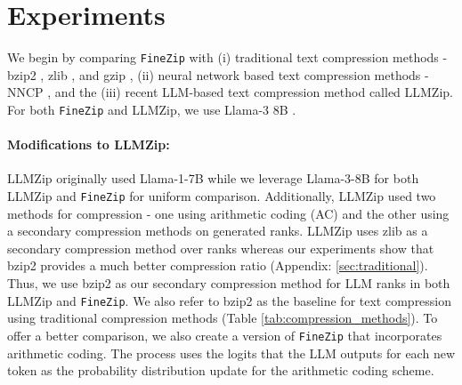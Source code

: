 \documentclass[11pt]{article}
\begin{document}





\section{Experiments}
We begin by comparing \texttt{FineZip} with (i) traditional text compression methods - bzip2 \cite{bzip2}, zlib \cite{zlib}, and gzip \cite{gzip}, (ii) neural network based text compression methods - NNCP \cite{Bellard2021NNCPVL}, and the (iii) recent LLM-based text compression method called LLMZip. For both  \texttt{FineZip} and LLMZip, we use Llama-3 8B \cite{llama3}.

\paragraph{Modifications to LLMZip:} LLMZip originally used Llama-1-7B \cite{llama1} while we leverage Llama-3-8B for both LLMZip and \texttt{FineZip} for uniform comparison. Additionally, LLMZip used two methods for compression - one using arithmetic coding (AC) and the other using a secondary compression methods on generated ranks. LLMZip uses zlib \cite{zlib} as a secondary compression method over ranks whereas our experiments show that bzip2 provides a much better compression ratio (Appendix: \ref{sec:traditional}). Thus, we use bzip2 as our secondary compression method for LLM ranks in both LLMZip and \texttt{FineZip}. We also refer to bzip2 as the baseline for text compression using traditional compression methods (Table \ref{tab:compression_methods}). To offer a better comparison, we also create a version of \texttt{FineZip} that incorporates arithmetic coding. The process uses the logits that the LLM outputs for each new token as the probability distribution update for the arithmetic coding scheme.%
\end{document}
